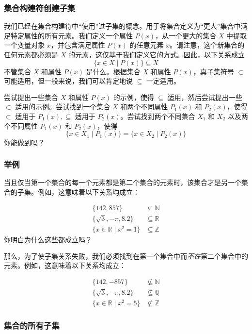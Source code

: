 \subsubsection*{集合构建符创建子集}

我们已经在集合构建符中``使用''过子集的概念。用于将集合定义为``更大''集合中满足特定属性的所有元素。我们定义一个属性 $P(x)$，从一个更大的集合 $X$ 中提取一个变量对象 $x$，并包含满足属性 $P(x)$ 的任意元素 $x$。请注意，这个新集合的任何元素都必须是 $X$ 的元素，这仅基于我们定义它的方式。因此，以下关系成立
\[\{x \in X \mid P(x)\} \subseteq X\]
不管集合 $X$ 和属性 $P(x)$ 是什么。根据集合 $X$ 和属性 $P(x)$，真子集符号 $\subset$ 可能适用，但一般来说，我们可以肯定地说 $\subseteq$ 一定适用。

尝试提出一些集合 $X$ 和属性 $P(x)$ 的示例，使得 $\subseteq$ 适用，然后尝试提出一些 $\subset$ 适用的示例。尝试找到一个集合 $X$ 和两个不同属性 $P_1(x)$ 和 $P_2(x)$，使得 $\subset$ 适用于 $P_1(x), \subseteq$ 适用于 $P_2(x)$。尝试找到两个不同集合 $X_1$ 和 $X_2$ 以及两个不同属性 $P_1(x)$ 和 $P_2(x)$，使得
\[\{x \in X_1 \mid P_1(x)\} = \{x \in X_2 \mid P_2(x)\}\]
你能做到吗？

\subsubsection*{举例}

当且仅当第一个集合的每一个元素都是第二个集合的元素时，该集合才是另一个集合的子集。例如，这意味着以下关系均成立：

\begin{align*}
    \{142, 857\} &\subseteq \mathbb{N} \\
    \{\sqrt{3}, -\pi, 8.2\} &\subseteq \mathbb{R} \\
    \{x \in \mathbb{R} \mid x^2 = 1\} &\subseteq \mathbb{Z}
\end{align*}
你明白为什么这些都成立吗？

那么，为了使子集关系失败，我们必须找到在第一个集合中而\emph{不在}第二个集合中的元素。例如，这意味着以下关系均成立：

\begin{align*}
    \{142, -857\} &\nsubseteq \mathbb{N} \\
    \{\sqrt{3}, -\pi, 8.2\} &\nsubseteq \mathbb{Q} \\
    \{x \in \mathbb{R} \mid x^2 = 5\} &\nsubseteq \mathbb{Z}
\end{align*}

\subsubsection*{集合的所有子集}

